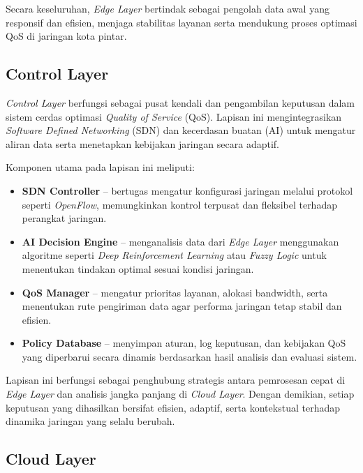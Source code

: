 \documentclass[a4paper,conference]{IEEEtran}
\begin{document}
Secara keseluruhan, \textit{Edge Layer} bertindak sebagai pengolah data awal yang responsif dan efisien, menjaga stabilitas layanan serta mendukung proses optimasi QoS di jaringan kota pintar.



\subsection{Control Layer}

\textit{Control Layer} berfungsi sebagai pusat kendali dan pengambilan keputusan dalam sistem cerdas optimasi \textit{Quality of Service} (QoS). 
Lapisan ini mengintegrasikan \textit{Software Defined Networking} (SDN) dan kecerdasan buatan (AI) untuk mengatur aliran data serta menetapkan kebijakan jaringan secara adaptif.

Komponen utama pada lapisan ini meliputi:

\begin{itemize}
    \item \textbf{SDN Controller} -- bertugas mengatur konfigurasi jaringan melalui protokol seperti \textit{OpenFlow}, memungkinkan kontrol terpusat dan fleksibel terhadap perangkat jaringan.
    \item \textbf{AI Decision Engine} -- menganalisis data dari \textit{Edge Layer} menggunakan algoritme seperti \textit{Deep Reinforcement Learning} atau \textit{Fuzzy Logic} untuk menentukan tindakan optimal sesuai kondisi jaringan.
    \item \textbf{QoS Manager} -- mengatur prioritas layanan, alokasi bandwidth, serta menentukan rute pengiriman data agar performa jaringan tetap stabil dan efisien.
    \item \textbf{Policy Database} -- menyimpan aturan, log keputusan, dan kebijakan QoS yang diperbarui secara dinamis berdasarkan hasil analisis dan evaluasi sistem.
\end{itemize}

Lapisan ini berfungsi sebagai penghubung strategis antara pemrosesan cepat di \textit{Edge Layer} dan analisis jangka panjang di \textit{Cloud Layer}. 
Dengan demikian, setiap keputusan yang dihasilkan bersifat efisien, adaptif, serta kontekstual terhadap dinamika jaringan yang selalu berubah.

\subsection{Cloud Layer}
\end{document}
